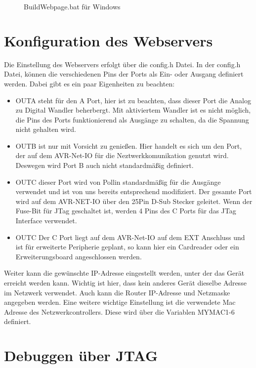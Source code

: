 \begin{figure}[H]

\caption{BuildWebpage.bat für Windows}
\label{output}
\end{figure}

\section{Konfiguration des Webservers}

Die Einstellung des Webservers erfolgt über die \textrm{config.h} Datei. In der
\textrm{config.h} Datei, können die verschiedenen Pins der Ports als Ein- oder
Ausgang definiert werden. Dabei gibt es ein paar Eigenheiten zu beachten:
\begin{itemize}
  \item OUTA steht für den A Port, hier ist zu beachten, dass dieser Port die
  Analog zu Digital Wandler beherbergt. Mit aktiviertem Wandler ist es nicht
  möglich, die Pins des Ports funktionierend als Ausgänge zu schalten, da die
  Spannung nicht gehalten wird.
  \item OUTB ist nur mit Vorsicht zu genießen. Hier handelt es sich um den Port,
  der auf dem AVR-Net-IO für die Neztwerkkomunikation genutzt wird. Deswegen
  wird Port B auch nicht standardmäßig definiert.
  \item OUTC dieser Port wird von Pollin standardmäßig für die Ausgänge verwendet
  und ist von uns bereits entsprechend modifiziert. Der gesamte Port wird auf dem
  AVR-NET-IO über den 25Pin D-Sub Stecker geleitet. Wenn der Fuse-Bit für JTag
  geschaltet ist, werden 4 Pins des C Ports für das JTag Interface verwendet.
  \item OUTC Der C Port liegt auf dem AVR-Net-IO auf dem EXT Anschluss und ist
  für erweiterte Peripherie geplant, so kann hier ein Cardreader oder ein
  Erweiterungsboard angeschlossen werden.
\end{itemize}
Weiter kann die gewünschte IP-Adresse eingestellt werden, unter der das Gerät
erreicht werden kann. Wichtig ist hier, dass kein anderes Gerät dieselbe Adresse
im Netzwerk verwendet. Auch kann die Router IP-Adresse und Netzmaske angegeben
werden. Eine weitere wichtige Einstellung ist die verwendete Mac Adresse
des Netzwerkcontrollers. Diese wird über die Variablen MYMAC1-6 definiert.

\section{Debuggen über JTAG}


